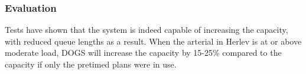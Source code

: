 








\subsubsection*{Evaluation}

Tests have shown that the system is indeed capable of increasing the
capacity, with reduced queue lengths as a result. When the arterial in
Herlev is at or above moderate load, DOGS will increase the capacity by
15-25\% compared to the capacity if only the pretimed plans were in
use.
